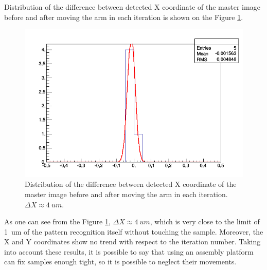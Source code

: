 Distribution of the difference between detected X coordinate of the master image before and after moving the arm in each iteration is shown on the Figure \ref{fig:platform_distribution}.

\begin{figure}[ht]\centering
\includegraphics[width=0.8\linewidth]{Data/Precision_tests/Platform_x_distrib.png}
\caption{Distribution of the difference between detected X coordinate of the master image before and after moving the arm in each iteration. $\Delta X \approx 4~um$. }
\label{fig:platform_distribution}
\end{figure}

As one can see from the Figure \ref{fig:platform_distribution}, $\Delta X \approx 4~um$, which is very close to the limit of 1~um of the pattern recognition itself without touching the sample. Moreover, the X and Y coordinates show no trend with respect to the iteration number. Taking into account these results, it is possible to say that using an assembly platform can fix samples enough tight, so it is possible to neglect their movements.